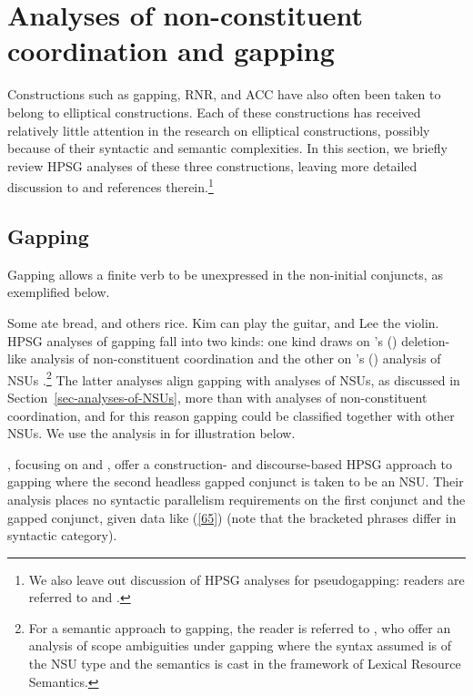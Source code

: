 \section{Analyses of non-constituent coordination and gapping}
\label{sec-analyses-of-noncon}

Constructions such as gapping, RNR, and ACC have also often been taken to belong to elliptical
constructions. Each of these constructions has received relatively little attention in the research
on elliptical constructions, possibly because of their syntactic and semantic complexities. In this
section, we briefly review HPSG analyses of these three constructions, leaving more detailed
discussion to  and references therein.\footnote{We also leave out
  discussion of HPSG analyses for pseudogapping: readers are referred to \citet{Miller92d-u,
    Kim2020} and .}


\subsection{Gapping}
\label{ellipsis:sec-gapping}

Gapping %
allows a finite
verb to be unexpressed in the non-initial conjuncts, as exemplified below. %

\eal
\label{ex-gapping}
\ex Some ate bread, and others rice.\label{g1}
\ex Kim can play the guitar, and Lee the violin.\label{g2}
\zl
%
%
%
%
HPSG analyses of gapping fall into two kinds: one kind draws on \citeauthor{Beavers2004}'s (\citeyear{Beavers2004}) deletion-like analysis of non-constituent coordination \citep{Chaves2009} and the other on \citeauthor{Ginzburg:Sag:2000}'s (\citeyear{Ginzburg:Sag:2000}) analysis of NSUs \citep{Abeille2014}.\footnote{For a semantic approach to gapping, the reader is referred to \citet{Parketal2019}, who offer an analysis of scope ambiguities under gapping where the syntax assumed is of the NSU  type and the semantics is cast in the framework of Lexical Resource Semantics.} The latter analyses align gapping with analyses of NSUs, as discussed in Section~\ref{sec-analyses-of-NSUs}, more than with analyses of non-constituent coordination, and for this reason gapping could be classified together with other NSUs. We use the analysis in \citet{Abeille2014} for illustration below.


\citet{Abeille2014}, focusing on  and , offer a construction- and
discourse-based HPSG approach to gapping where the second headless gapped conjunct is taken to be an
NSU.  %
Their analysis places no syntactic parallelism requirements on the
first conjunct and the gapped conjunct, given  data like (\ref{65}) (note that the bracketed phrases differ in syntactic category).

